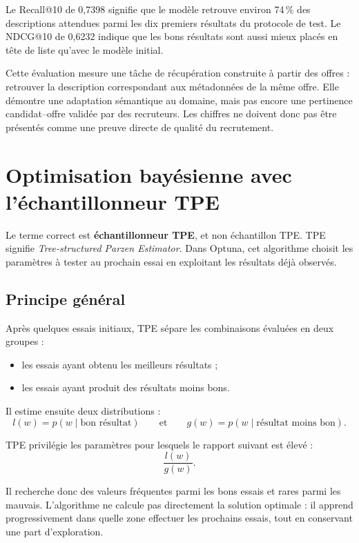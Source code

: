 \documentclass[12pt,a4paper]{article}
\begin{document}
Le Recall@10 de 0,7398 signifie que le modèle retrouve environ 74\,\% des descriptions attendues
parmi les dix premiers résultats du protocole de test. Le NDCG@10 de 0,6232 indique que les bons
résultats sont aussi mieux placés en tête de liste qu'avec le modèle initial.

\begin{alertbox}
Cette évaluation mesure une tâche de récupération construite à partir des offres : retrouver la
description correspondant aux métadonnées de la même offre. Elle démontre une adaptation
sémantique au domaine, mais pas encore une pertinence candidat--offre validée par des recruteurs.
Les chiffres ne doivent donc pas être présentés comme une preuve directe de qualité du recrutement.
\end{alertbox}

\newpage
\section{Optimisation bayésienne avec l'échantillonneur TPE}

Le terme correct est \textbf{échantillonneur TPE}, et non \og échantillon TPE\fg{}. TPE signifie
\emph{Tree-structured Parzen Estimator}. Dans Optuna, cet algorithme choisit les paramètres à
tester au prochain essai en exploitant les résultats déjà observés.

\subsection{Principe général}

Après quelques essais initiaux, TPE sépare les combinaisons évaluées en deux groupes :

\begin{itemize}
  \item les essais ayant obtenu les meilleurs résultats ;
  \item les essais ayant produit des résultats moins bons.
\end{itemize}

Il estime ensuite deux distributions :
\[
l(w)=p(w\mid \text{bon résultat})
\qquad\text{et}\qquad
g(w)=p(w\mid \text{résultat moins bon}).
\]

TPE privilégie les paramètres pour lesquels le rapport suivant est élevé :
\[
\frac{l(w)}{g(w)}.
\]

Il recherche donc des valeurs fréquentes parmi les bons essais et rares parmi les mauvais.
L'algorithme ne calcule pas directement la solution optimale : il apprend progressivement dans
quelle zone effectuer les prochains essais, tout en conservant une part d'exploration.
\end{document}

